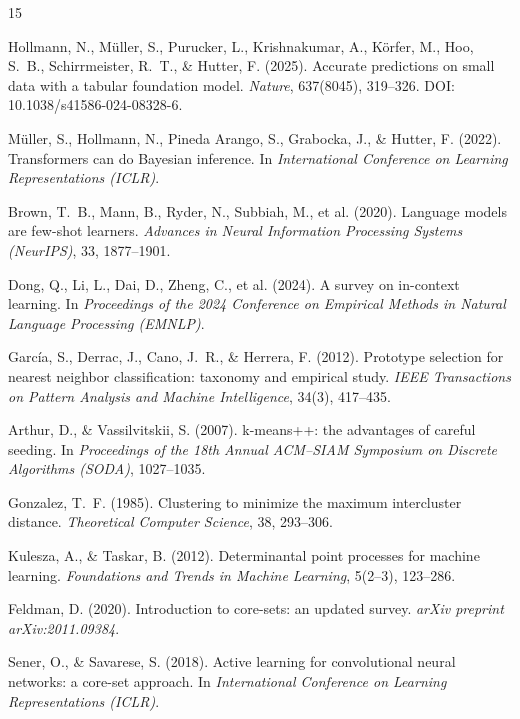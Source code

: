 \documentclass[11pt,a4paper]{article}
\begin{document}
\begin{thebibliography}{15}

Hollmann, N., Müller, S., Purucker, L., Krishnakumar, A., Körfer, M.,
Hoo, S.~B., Schirrmeister, R.~T., \& Hutter, F. (2025).
Accurate predictions on small data with a tabular foundation model.
\textit{Nature}, 637(8045), 319--326. DOI: 10.1038/s41586-024-08328-6.

Müller, S., Hollmann, N., Pineda Arango, S., Grabocka, J., \& Hutter, F. (2022).
Transformers can do Bayesian inference.
In \textit{International Conference on Learning Representations (ICLR)}.

Brown, T.~B., Mann, B., Ryder, N., Subbiah, M., et al. (2020).
Language models are few-shot learners.
\textit{Advances in Neural Information Processing Systems (NeurIPS)}, 33,
1877--1901.

Dong, Q., Li, L., Dai, D., Zheng, C., et al. (2024).
A survey on in-context learning.
In \textit{Proceedings of the 2024 Conference on Empirical Methods in Natural
Language Processing (EMNLP)}.

García, S., Derrac, J., Cano, J.~R., \& Herrera, F. (2012).
Prototype selection for nearest neighbor classification: taxonomy and empirical
study.
\textit{IEEE Transactions on Pattern Analysis and Machine Intelligence},
34(3), 417--435.

Arthur, D., \& Vassilvitskii, S. (2007).
k-means++: the advantages of careful seeding.
In \textit{Proceedings of the 18th Annual ACM--SIAM Symposium on Discrete
Algorithms (SODA)}, 1027--1035.

Gonzalez, T.~F. (1985).
Clustering to minimize the maximum intercluster distance.
\textit{Theoretical Computer Science}, 38, 293--306.

Kulesza, A., \& Taskar, B. (2012).
Determinantal point processes for machine learning.
\textit{Foundations and Trends in Machine Learning}, 5(2--3), 123--286.

Feldman, D. (2020).
Introduction to core-sets: an updated survey.
\textit{arXiv preprint arXiv:2011.09384}.

Sener, O., \& Savarese, S. (2018).
Active learning for convolutional neural networks: a core-set approach.
In \textit{International Conference on Learning Representations (ICLR)}.


\end{thebibliography}
\end{document}
